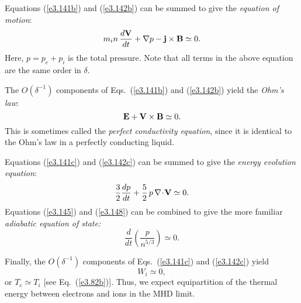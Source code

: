 Equations (\ref{e3.141b}) and (\ref{e3.142b}) can be summed to give the
{\em equation of motion}:
\begin{equation}
m_i n\,\frac{d{\bf V}}{dt} + \nabla p - {\bf j}\times{\bf B} \simeq 0.
\end{equation}
Here, $p=p_e+p_i$ is the total pressure. 
Note that all terms in the above  equation are the same order in $\delta$. 

The $O(\delta^{-1})$ components of Eqs.~(\ref{e3.141b}) and (\ref{e3.142b}) yield
the {\em Ohm's law}:
\begin{equation}\label{e3.147}
{\bf E} + {\bf V}\times {\bf B} \simeq 0.
\end{equation}
This is sometimes called the {\em perfect conductivity equation}, since
it is identical to the Ohm's law in a perfectly conducting liquid. 

Equations (\ref{e3.141c}) and (\ref{e3.142c}) can be summed to give the
{\em energy evolution equation}:
\begin{equation}\label{e3.148}
\frac{3}{2} \frac{dp}{dt} + \frac{5}{2}\, p \,\nabla\!\cdot\!{\bf V} \simeq 0.
\end{equation}
Equations (\ref{e3.145}) and (\ref{e3.148}) can be combined to give the more familiar
{\em adiabatic equation of state:}
\begin{equation}
\frac{d}{dt}\!\left(\frac{p}{n^{5/3}}\right) \simeq 0.
\end{equation}

Finally, the $O(\delta^{-1})$ components of Eqs.~(\ref{e3.141c}) and (\ref{e3.142c}) 
yield
\begin{equation}
W_i \simeq 0,
\end{equation}
or $T_e\simeq T_i$ [see Eq.~(\ref{e3.82b})]. Thus, we expect equipartition of the
thermal energy between electrons and ions in  the MHD limit. 

